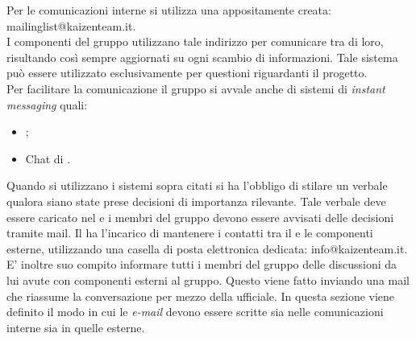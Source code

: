 				Per  le comunicazioni interne si utilizza una  appositamente creata: mailinglist@kaizenteam.it.\\
				I componenti del gruppo utilizzano tale indirizzo per comunicare tra di loro, risultando così sempre aggiornati su ogni scambio di informazioni. Tale sistema può essere utilizzato esclusivamente per questioni riguardanti il progetto.\\
				Per facilitare la comunicazione il gruppo si avvale anche di sistemi di \textit{instant messaging} quali:
				\begin{itemize}
					\item {};
					\item Chat di .
				\end{itemize}
				\begin{figure}[H]
					 \hspace{5mm}
				\end{figure}
				Quando si utilizzano i sistemi sopra citati si ha l'obbligo di stilare un verbale qualora siano state prese decisioni di importanza rilevante. Tale verbale deve essere caricato nel  e i membri del gruppo devono essere avvisati delle decisioni tramite mail.
				Il  ha l’incarico di mantenere i contatti tra il  e le componenti esterne, utilizzando una casella di posta elettronica dedicata: info@kaizenteam.it.\\
				E' inoltre suo compito informare tutti i membri del gruppo delle discussioni da lui avute con componenti esterni al gruppo. Questo viene fatto inviando una mail che riassume la conversazione per mezzo della  ufficiale.
				In questa sezione viene definito il modo in cui le \textit{e-mail} devono essere scritte sia nelle comunicazioni interne sia in quelle esterne.
